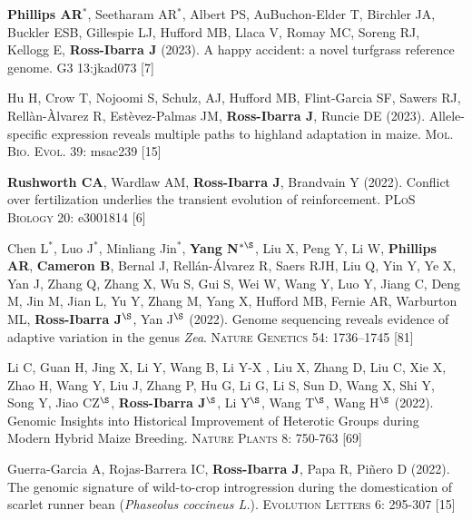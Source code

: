 \documentclass[letterpaper,10pt]{article}
\begin{document}
\begin{etaremune}
\item \textbf{Phillips AR}$^*$, Seetharam AR$^*$, Albert PS, AuBuchon-Elder T, Birchler JA, Buckler ESB,    Gillespie LJ, Hufford MB,    Llaca V,  Romay MC,  Soreng RJ, Kellogg E, \textbf{Ross-Ibarra J} (2023). A happy accident: a novel turfgrass reference genome. \textsc{G3} 13:jkad073
 [7]\\

\item Hu H, Crow T, Nojoomi S, Schulz, AJ, Hufford MB, Flint-Garcia SF, Sawers RJ, Rell\`{a}n-\`{A}lvarez R, Est\`{e}vez-Palmas JM, \textbf{Ross-Ibarra J}, Runcie DE (2023). Allele-specific expression reveals multiple paths to highland adaptation in maize. \textsc{Mol. Bio. Evol.} 39: msac239
 [15]\\

\item \textbf{Rushworth CA}, Wardlaw AM, \textbf{Ross-Ibarra J}, Brandvain Y (2022). Conflict over fertilization underlies the transient evolution of reinforcement. \textsc{PLoS Biology} 20: e3001814 %
 [6]\\

\item Chen L$^*$, Luo J$^*$, Minliang Jin$^*$, \textbf{Yang N$^{*\S}$}, Liu X, Peng Y, Li W, \textbf{Phillips AR}, \textbf{Cameron B}, Bernal J, Rell\'{a}n-\'{A}lvarez R, Saers RJH, Liu Q, Yin Y, Ye X, Yan J, Zhang Q, Zhang X, Wu S, Gui S, Wei W, Wang Y, Luo Y, Jiang C, Deng M, Jin M, Jian L, Yu Y, Zhang M, Yang X, Hufford MB, Fernie AR, Warburton ML, \textbf{Ross-Ibarra J$^\S$}, Yan J$^\S$ (2022). Genome sequencing reveals evidence of adaptive variation in the genus \textit{Zea}. \textsc{Nature Genetics} 54: 1736–1745
 [81]\\

\item Li C, Guan H, Jing X, Li Y, Wang B, Li Y-X , Liu X, Zhang D, Liu C, Xie X, Zhao H, Wang Y, Liu J, Zhang P, Hu G, Li G, Li S, Sun D, Wang X, Shi Y, Song Y, Jiao CZ$^\S$, \textbf{Ross-Ibarra J}$^\S$, Li Y$^\S$, Wang T$^\S$, Wang H$^\S$ (2022). Genomic Insights into Historical Improvement of Heterotic Groups during Modern Hybrid Maize Breeding. \textsc{Nature Plants} 8: 750-763
 [69]\\

\item Guerra-Garcia A, Rojas-Barrera IC, \textbf{Ross-Ibarra J}, Papa R, Pi\~nero D (2022). The genomic signature of wild-to-crop introgression during the domestication of scarlet runner bean (\textit{Phaseolus coccineus L.}). \textsc{Evolution Letters} 6: 295-307 %
 [15]\\


\end{etaremune}
\end{document}

